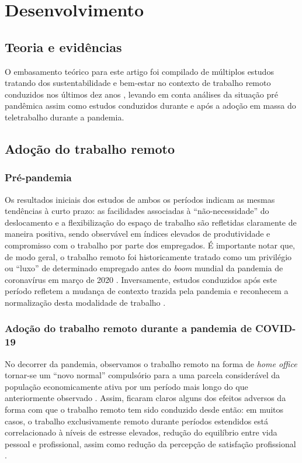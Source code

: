 \documentclass[12pt]{article}
\begin{document}
\section{Desenvolvimento}
\subsection{Teoria e evidências}

O embasamento teórico para este artigo foi compilado de múltiplos estudos tratando dos sustentabilidade e bem-estar no 
contexto de trabalho remoto conduzidos nos últimos dez anos \cite{mckinsey2022,ijerph2021,ntwe2017,forbes2023},
levando em conta análises da situação pré pandêmica \cite{ntwe2017} assim como estudos conduzidos durante e após a
adoção em massa do \gls{teletrabalho} durante a pandemia\cite{mckinsey2022,ijerph2021,sustainability2022}. 

\subsection{Adoção do trabalho remoto}
\subsubsection{Pré-pandemia}

Os resultados iniciais dos estudos de ambos os períodos indicam as mesmas tendências à curto prazo: as facilidades associadas à
``não-necessidade'' do deslocamento e a flexibilização do espaço de trabalho são refletidas claramente de maneira positiva,
sendo observável em índices elevados de produtividade e compromisso com o trabalho \cite{ntwe2017} por parte dos
empregados. É importante notar que, de modo geral, o trabalho remoto foi historicamente tratado como um privilégio ou ``luxo'' de
determinado empregado antes do \textit{boom} mundial da pandemia de coronavírus em março de 2020 
\cite{ntwe2017,sustainability2022,diMartino1990}. Inversamente, estudos conduzidos após este período refletem a mudança
de contexto trazida pela pandemia e reconhecem a normalização desta modalidade de trabalho
\cite{hofschulteBeck2022,sustainability2022}.

\subsubsection{Adoção do trabalho remoto durante a pandemia de COVID-19}

No decorrer da pandemia, observamos o trabalho remoto na forma de \textit{home office} tornar-se um ``novo
normal'' compulsório para a uma parcela considerável da população economicamente ativa por um período mais longo do que
anteriormente observado \cite{mckinsey2022,sustainability2022,phillips2020}. Assim, ficaram claros alguns dos efeitos adversos da forma com
que o trabalho remoto tem sido conduzido desde então: em muitos casos, o trabalho exclusivamente remoto durante
períodos estendidos está correlacionado à níveis de estresse elevados, redução do equilíbrio entre vida pessoal e profissional,
assim como redução da percepção de satisfação profissional \cite{ijerph2021,forbes2023}.
\end{document}
